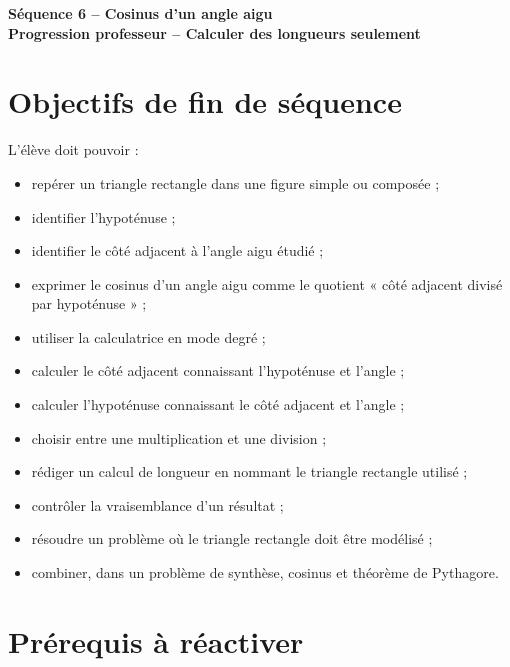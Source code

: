 \documentclass[12pt,a4paper]{article}
\newcommand{\titreseq}[1]{%
\begin{center}
{\sffamily\LARGE\bfseries\color{TitreC}Séquence 6 -- Cosinus d'un angle aigu}\\[0.2em]
{\sffamily\large\bfseries\color{SavoirC}#1}
\end{center}}
\begin{document}
\titreseq{Progression professeur -- Calculer des longueurs seulement}


\section*{Objectifs de fin de séquence}

L'élève doit pouvoir :

\begin{itemize}
  \item repérer un triangle rectangle dans une figure simple ou composée ;
  \item identifier l'hypoténuse ;
  \item identifier le côté adjacent à l'angle aigu étudié ;
  \item exprimer le cosinus d'un angle aigu comme le quotient
        « côté adjacent divisé par hypoténuse » ;
  \item utiliser la calculatrice en mode degré ;
  \item calculer le côté adjacent connaissant l'hypoténuse et l'angle ;
  \item calculer l'hypoténuse connaissant le côté adjacent et l'angle ;
  \item choisir entre une multiplication et une division ;
  \item rédiger un calcul de longueur en nommant le triangle rectangle utilisé ;
  \item contrôler la vraisemblance d'un résultat ;
  \item résoudre un problème où le triangle rectangle doit être modélisé ;
  \item combiner, dans un problème de synthèse, cosinus et théorème de Pythagore.
\end{itemize}

\section*{Prérequis à réactiver}
\end{document}

